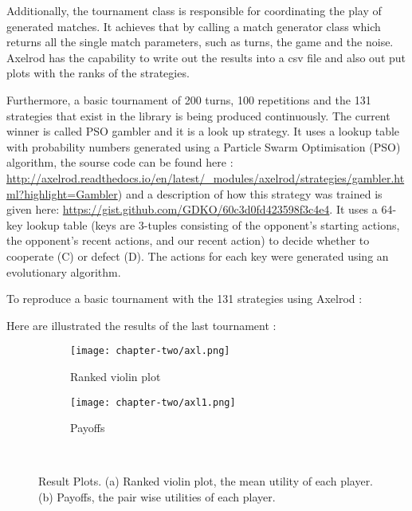 Additionally, the tournament class is responsible for coordinating the play of
generated matches. It achieves that by calling a match generator class which
returns all the single match parameters, such as turns, the game and the noise.
Axelrod has the capability to write out the results into a csv file and also out
put plots with the ranks of the strategies.

Furthermore, a basic tournament of 200 turns, 100 repetitions and the 131
strategies that exist in the library is being produced continuously. The current
winner is called PSO gambler and it is a look up strategy. It uses a lookup
table with probability numbers generated using a Particle Swarm Optimisation
(PSO) algorithm, the sourse code can be found here :
 \url{http://axelrod.readthedocs.io/en/latest/_modules/axelrod/strategies/gambler.html?highlight=Gambler})
 and a description of how this strategy was trained is given here:
 \url{https://gist.github.com/GDKO/60c3d0fd423598f3c4e4}.
It uses a 64-key lookup table (keys are 3-tuples consisting of the opponent's
starting actions, the opponent's recent actions, and our recent action) to
decide whether to cooperate (C) or defect (D). The actions for each key were
generated using an evolutionary algorithm.

To reproduce a basic tournament with the 131 strategies using Axelrod :


 Here are illustrated the results of the last tournament :
 \newpage

\begin{figure}[h]
\centering
    \begin{subfigure}[t]{0.7\textwidth}
    \centering
        \texttt{[image: chapter-two/axl.png]}
    \caption{Ranked violin plot}
    \end{subfigure}
\hfill
    \begin{subfigure}[t]{0.70\textwidth}\centering
    \centering
        \texttt{[image: chapter-two/axl1.png]}
    \caption{Payoffs}
    \end{subfigure}
~
\caption{Result Plots. (a) Ranked violin plot, the mean utility of each player.
(b) Payoffs, the pair wise utilities of each player.}
\label{fig:axelrodplots}
\end{figure}

